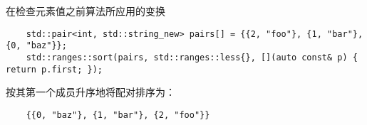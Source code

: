 在检查元素值之前算法所应用的变换

\begin{example}[\noindent]
  \begin{lstlisting}
    std::pair<int, std::string_new> pairs[] = {{2, "foo"}, {1, "bar"}, {0, "baz"}};
    std::ranges::sort(pairs, std::ranges::less{}, [](auto const& p) { return p.first; });
  \end{lstlisting}
  按其第一个成员升序地将配对排序为：
  \begin{lstlisting}
    {{0, "baz"}, {1, "bar"}, {2, "foo"}}
  \end{lstlisting}
\end{example}
